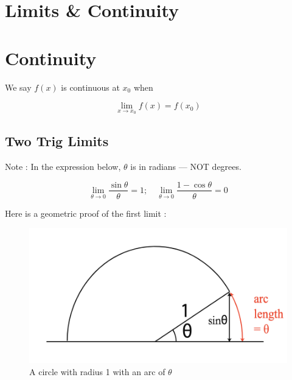 

\section*{\centering Limits \& Continuity}

\bigbreak
\section{Continuity}

We say $f(x)$ is continuous at $x_0$ when

\begin{equation*}
\lim_{x \to x_0} f(x) = f(x_0)
\end{equation*}

\subsection*{Two Trig Limits}

Note : In the expression below, $\theta$ is in radians --- NOT degrees.

\begin{equation*}
\boxed{
	\lim_{\theta \to 0} \frac{\sin \theta}{\theta} = 1; \quad \lim_{\theta \to 0} \frac{1-\cos \theta}{\theta} = 0
}
\end{equation*}

Here is a geometric proof of the first limit : 

\begin{figure}[h]
	\centering
	\includegraphics[scale=0.7]{./images/lecture_2_figure_1.png}
	\caption{A circle with radius 1 with an arc of $\theta$}    
\end{figure}

